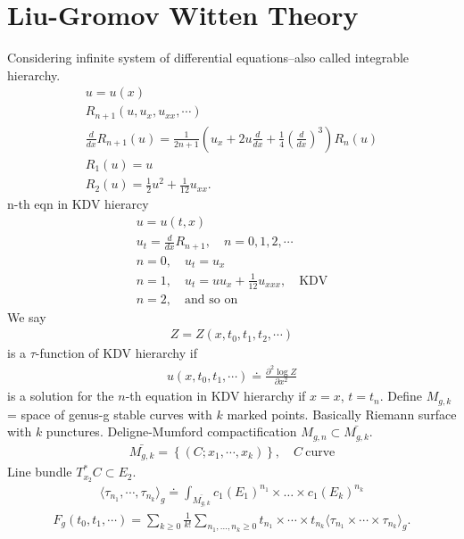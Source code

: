 \documentclass[12pt,reqno]{amsart}
\numberwithin{equation}{section}  %
\newcommand{\p}{\partial}
\begin{document}
\section{Liu-Gromov Witten Theory} 
\label{sec:liu}
Considering infinite system of differential equations--also called integrable
hierarchy. 
\begin{gather*}
     u = u(x)
    \\
    R_{n+1}(u, u_{x}, u_{xx}, \cdots)
    \\
    \frac{d}{dx} R_{n+1}(u) = \frac{1}{2n+1} \left( u_{x} + 2u \frac{d}{dx} +
    \frac{1}{4}\left( \frac{d}{dx} \right)^{3} \right) R_{n}(u)
    \\
    R_{1}(u) = u
    \\
    R_{2}(u) = \frac{1}{2} u^{2} + \frac{1}{12} u_{xx}.
\end{gather*}
n-th eqn in KDV hierarcy
%
%
\begin{gather*}
    u = u(t,x)
    \\
    u_{t} =  \frac{d}{dx}R_{n+1}, \quad n = 0,1,2,\cdots
    \\
    n = 0, \quad u_{t} = u_{x}
    \\
    n=1, \quad u_{t} = uu_{x} + \frac{1}{12}u_{xxx}, \quad \text{KDV}
    \\
    n=2, \quad \text{and so on}
\end{gather*}
We say
\begin{gather*}
  Z = Z(x, t_{0}, t_{1}, t_{2}, \cdots)
\end{gather*}
is a $\tau$-function of KDV hierarchy if
\begin{gather*}
  u(x, t_{0}, t_{1}, \cdots) \doteq \frac{\p^{2} \log Z}{\p x^{2}}
\end{gather*}
is a solution for the $n$-th equation in KDV hierarchy if $x =x$, $t =
t_{n}$. 
Define $M_{g,k}$ = space of genus-g stable curves with $k$ marked points.
Basically Riemann surface with $k$ punctures. Deligne-Mumford compactification $ M_{g,n} \subset \bar{M_{g,k}}$.
\begin{gather*}
  \bar{M_{g,k}} = \left\{ (C; x_{1}, \cdots, x_{k}) \right\}, \quad C \
  \text{curve} 
\end{gather*}
Line bundle $T_{x_{2}}^{*}C \subset E_{2}$.
\begin{gather*}
  \langle \tau_{n_{1}}, \cdots, \tau_{n_{k}} \rangle_{g} \doteq
  \int_{\bar{M_{g,k}}} c_{1}(E_{1})^{n_{1}} \times \ldots \times
  c_{1}(E_{k})^{n_{k}}
\end{gather*}
\begin{gather*}
  F_{g}(t_{0}, t_{1}, \cdots) = \sum_{k \ge 0} \frac{1}{k!} \sum_{n_{1}, \ldots,
  n_{k} \ge 0} t_{n_{1}} \times\cdots\times t_{n_{k}} \langle \tau_{n_{1}}
  \times\cdots \times \tau_{n_{k}} \rangle_{g}.
\end{gather*}
\end{document}
